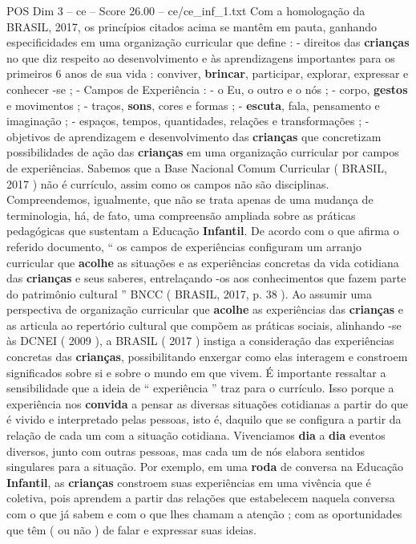 \begin{textsample}{POS Dim 3 – ce – Score 26.00 – ce/ce\_inf\_1.txt}
Com a homologação da BRASIL, 2017, os princípios citados acima se mantêm em pauta, ganhando especificidades em uma organização curricular que define : - direitos das \textbf{crianças} no que diz respeito ao desenvolvimento e às aprendizagens importantes para os primeiros 6 anos de sua vida : conviver, \textbf{brincar}, participar, explorar, expressar e conhecer -se ; - Campos de Experiência : - o Eu, o outro e o nós ; - corpo, \textbf{gestos} e movimentos ; - traços, \textbf{sons}, cores e formas ; - \textbf{escuta}, fala, pensamento e imaginação ; - espaços, tempos, quantidades, relações e transformações ; - objetivos de aprendizagem e desenvolvimento das \textbf{crianças} que concretizam possibilidades de ação das \textbf{crianças} em uma organização curricular por campos de experiências.
Sabemos que a Base Nacional Comum Curricular ( BRASIL, 2017 ) não é currículo, assim como os campos não são disciplinas.
Compreendemos, igualmente, que não se trata apenas de uma mudança de terminologia, há, de fato, uma compreensão ampliada sobre as práticas pedagógicas que sustentam a Educação \textbf{Infantil}.
De acordo com o que afirma o referido documento, “ os campos de experiências configuram um arranjo curricular que \textbf{acolhe} as situações e as experiências concretas da vida cotidiana das \textbf{crianças} e seus saberes, entrelaçando -os aos conhecimentos que fazem parte do patrimônio cultural ” BNCC ( BRASIL, 2017, p. 38 ).
Ao assumir uma perspectiva de organização curricular que \textbf{acolhe} as experiências das \textbf{crianças} e as articula ao repertório cultural que compõem as práticas sociais, alinhando -se às DCNEI ( 2009 ), a BRASIL ( 2017 ) instiga a consideração das experiências concretas das \textbf{crianças}, possibilitando enxergar como elas interagem e constroem significados sobre si e sobre o mundo em que vivem.
É importante ressaltar a sensibilidade que a ideia de “ experiência ” traz para o currículo.
Isso porque a experiência nos \textbf{convida} a pensar as diversas situações cotidianas a partir do que é vivido e interpretado pelas pessoas, isto é, daquilo que se configura a partir da relação de cada um com a situação cotidiana.
Vivenciamos \textbf{dia} a \textbf{dia} eventos diversos, junto com outras pessoas, mas cada um de nós elabora sentidos singulares para a situação.
Por exemplo, em uma \textbf{roda} de conversa na Educação \textbf{Infantil}, as \textbf{crianças} constroem suas experiências em uma vivência que é coletiva, pois aprendem a partir das relações que estabelecem naquela conversa com o que já sabem e com o que lhes chamam a atenção ; com as oportunidades que têm ( ou não ) de falar e expressar suas ideias.

\end{textsample}
